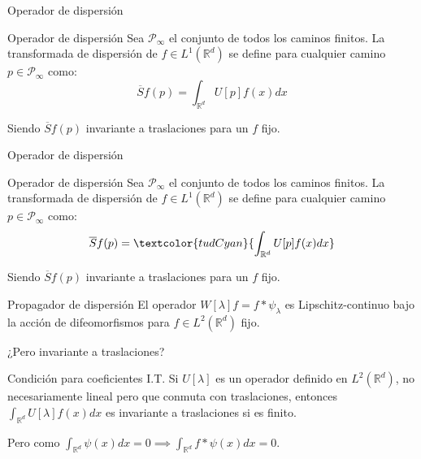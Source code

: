 \documentclass[aspectratio=43]{beamer}
\begin{document}
\begin{frame}{Operador de dispersión}
  \begin{alertblock}{Operador de dispersión}
    Sea $\mathcal{P}_\infty$ el conjunto de todos los caminos finitos. La transformada de dispersión de $f \in L^1(\mathbb{R}^d)$ se define para cualquier camino $p \in \mathcal{P}_\infty$ como:
    \begin{equation}
      \overline{S}f(p)=\int_{\mathbb{R}^d}U[p]f(x)dx 
    \end{equation}
  \end{alertblock}

  Siendo $\overline{S}f(p)$ invariante a traslaciones para un $f$ fijo.
\end{frame}


\begin{frame}{Operador de dispersión}
  \begin{alertblock}{Operador de dispersión}
    Sea $\mathcal{P}_\infty$ el conjunto de todos los caminos finitos. La transformada de dispersión de $f \in L^1(\mathbb{R}^d)$ se define para cualquier camino $p \in \mathcal{P}_\infty$ como:
    \begin{equation}
      \overline{S}f(p)=\textcolor{tudCyan}{\int_{\mathbb{R}^d}U[p]f(x)dx} 
    \end{equation}
  \end{alertblock}

  Siendo $\overline{S}f(p)$ invariante a traslaciones para un $f$ fijo.
\end{frame}


\begin{frame}{Propagador de dispersión}
  El operador $W[\lambda]f=f\ast \psi_\lambda$ es Lipschitz-continuo bajo la acción de difeomorfismos para $f \in L^2(\mathbb{R}^d)$ fijo. 

  \medskip

  \textcolor{tudCyan}{¿Pero invariante a traslaciones?}

  \medskip

  \begin{alertblock}{Condición para coeficientes I.T.}
    Si $U[\lambda]$ es un operador definido en $L^2(\mathbb{R}^d)$, no necesariamente lineal pero que conmuta con traslaciones, entonces $\int_{\mathbb{R}^d} U[\lambda]f(x)dx$ es invariante a traslaciones si es finito.
  \end{alertblock}
  \medskip
  Pero como $\int_{\mathbb{R}^d} \psi(x)dx=0 \implies \int_{\mathbb{R}^d} f \ast \psi(x) dx=0$. 
\end{frame}
\end{document}
